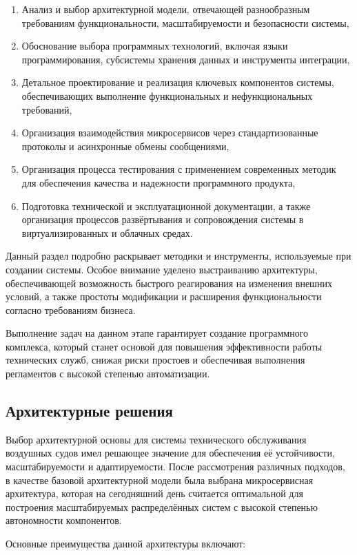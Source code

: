 \documentclass[14pt,a4paper]{extarticle}
\begin{document}
\begin{enumerate}
\item Анализ и выбор архитектурной модели, отвечающей разнообразным требованиям функциональности, масштабируемости и безопасности системы,
\item Обоснование выбора программных технологий, включая языки программирования, субсистемы хранения данных и инструменты интеграции,
\item Детальное проектирование и реализация ключевых компонентов системы, обеспечивающих выполнение функциональных и нефункциональных требований,
\item Организация взаимодействия микросервисов через стандартизованные протоколы и асинхронные обмены сообщениями,
\item Организация процесса тестирования с применением современных методик для обеспечения качества и надежности программного продукта,
\item Подготовка технической и эксплуатационной документации, а также организация процессов развёртывания и сопровождения системы в виртуализированных и облачных средах.
\end{enumerate}

Данный раздел подробно раскрывает методики и инструменты, используемые при создании системы. Особое внимание уделено выстраиванию архитектуры, обеспечивающей возможность быстрого реагирования на изменения внешних условий, а также простоты модификации и расширения функциональности согласно требованиям бизнеса.

Выполнение задач на данном этапе гарантирует создание программного комплекса, который станет основой для повышения эффективности работы технических служб, снижая риски простоев и обеспечивая выполнения регламентов с высокой степенью автоматизации.

\subsection{Архитектурные решения}

Выбор архитектурной основы для системы технического обслуживания воздушных судов имел решающее значение для обеспечения её устойчивости, масштабируемости и адаптируемости. После рассмотрения различных подходов, в качестве базовой архитектурной модели была выбрана микросервисная архитектура, которая на сегодняшний день считается оптимальной для построения масштабируемых распределённых систем с высокой степенью автономности компонентов.

Основные преимущества данной архитектуры включают:
\end{document}
